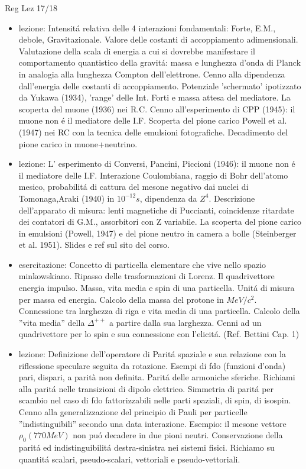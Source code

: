 \begin{frame}[allowframebreaks]{Reg Lez 17/18}
\begin{itemize}
\item lezione: Intensit\'a relativa delle 4 interazioni fondamentali: Forte, E.M., debole, Gravitazionale. Valore delle costanti di accoppiamento adimensionali. Valutazione della scala di energia a cui si dovrebbe manifestare il comportamento quantistico della gravit\'a: massa e lunghezza d'onda di Planck in analogia alla lunghezza Compton dell'elettrone. Cenno alla dipendenza dall'energia delle costanti di accoppiamento. Potenziale 'schermato' ipotizzato da Yukawa (1934), 'range' delle Int. Forti e massa attesa del mediatore. La scoperta del muone (1936) nei R.C. Cenno all'esperimento di CPP (1945): il muone non \'e il mediatore delle I.F. Scoperta del pione carico Powell et al. (1947) nei RC con la tecnica delle emulsioni fotografiche. Decadimento del pione carico in muone+neutrino.

\item lezione: L' esperimento di Conversi, Pancini, Piccioni (1946): il muone non \'e il mediatore delle I.F. Interazione Coulombiana, raggio di Bohr dell'atomo mesico, probabilit\'a di cattura del mesone negativo dai nuclei di Tomonaga,Araki (1940) in $10^{-12}s$, dipendenza da $Z^4$. Descrizione dell'apparato di misura: lenti magnetiche di Puccianti, coincidenze ritardate dei contatori di G.M., assorbitori con Z variabile. La scoperta del pione carico in emulsioni (Powell, 1947) e del pione neutro in camera a bolle (Steinberger et al. 1951). Slides e ref sul sito del corso.

\item esercitazione: Concetto di particella elementare che vive nello spazio minkowskiano. Ripasso delle trasformazioni di Lorenz. Il quadrivettore energia impulso. Massa, vita media e spin di una particella. Unit\'a di misura per massa ed energia. Calcolo della massa del protone in $MeV/c^2$. Connessione tra larghezza di riga e vita media di una particella. Calcolo della ''vita media'' della $\Delta^{++}$ a partire dalla sua larghezza. Cenni ad un quadrivettore per lo spin e sua connessione con l'elicit\'a. (Ref. Bettini Cap. 1) 

\item lezione: Definizione dell'operatore di Parit\'a spaziale e sua relazione con la riflessione speculare seguita da rotazione. Esempi di fdo (funzioni d'onda) pari, dispari, a parità non definita.  Parit\'a delle armoniche sferiche. Richiami alla parit\'a nelle transizioni di dipolo elettrico. Simmetria di  parit\'a per scambio nel caso di fdo fattorizzabili nelle parti spaziali, di spin, di isospin. Cenno alla generalizzazione del principio di Pauli per particelle ''indistinguibili'' secondo una data interazione. Esempio: il mesone vettore $\rho_0(770 MeV)$ non pu\'o decadere in due pioni neutri. Conservazione della parit\'a ed indistinguibilit\'a destra-sinistra nei sistemi fisici. Richiamo su quantit\'a scalari, pseudo-scalari, vettoriali e pseudo-vettoriali.


\end{itemize}
\end{frame}

